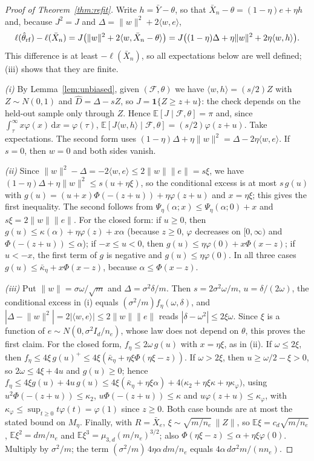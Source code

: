 \documentclass[10pt,a4paper]{article}
\theoremstyle{plain}
\theoremstyle{definition}
\theoremstyle{remark}
\newcommand{\E}{\mathbb{E}}
\newcommand{\Dh}{\widehat{D}}
\newcommand{\Ybar}{\bar{Y}}
\newcommand{\norm}[1]{\lVert #1\rVert}
\newcommand{\ip}[1]{\langle #1\rangle}
\newcommand{\dd}{\mathrm{d}}
\begin{document}
\begin{proof}[Proof of Theorem~\ref{thm:refit}]
Write $h=\Ybar-\theta$, so that $\bar X_n-\theta=(1-\eta)e+\eta h$ and, because $J^2=J$ and $\Delta=\norm w^2+2\ip{w,e}$,
\[
\ell(\hat\theta_{\rm rf})-\ell(\bar X_n)=J\big(\norm w^2+2\ip{w,\bar X_n-\theta}\big)=J\big((1-\eta)\Delta+\eta\norm w^2+2\eta\ip{w,h}\big).
\]
This difference is at least $-\ell(\bar X_n)$, so all expectations below are well defined; (iii) shows that they are finite.

\noindent\textit{(i)} By Lemma~\ref{lem:unbiased}, given $(\mathcal F,\theta)$ we have $\ip{w,h}=(s/2)Z$ with $Z\sim N(0,1)$ and $\Dh=\Delta-sZ$, so $J=\mathbf 1\{Z\ge z+u\}$: the check depends on the held-out sample only through $Z$. Hence $\E[J\mid\mathcal F,\theta]=\pi$ and, since $\int_\tau^\infty x\varphi(x)\,\dd x=\varphi(\tau)$, $\E[J\ip{w,h}\mid\mathcal F,\theta]=(s/2)\varphi(z+u)$. Take expectations. The second form uses $(1-\eta)\Delta+\eta\norm w^2=\Delta-2\eta\ip{w,e}$. If $s=0$, then $w=0$ and both sides vanish.

\noindent\textit{(ii)} Since $\norm w^2-\Delta=-2\ip{w,e}\le2\norm w\norm e=s\xi$, we have $(1-\eta)\Delta+\eta\norm w^2\le s(u+\eta\xi)$, so the conditional excess is at most $s\,g(u)$ with $g(u)=(u+x)\Phi(-(z+u))+\eta\varphi(z+u)$ and $x=\eta\xi$; this gives the first inequality. The second follows from $\Psi_\eta(\alpha;x)\le\Psi_\eta(\alpha;0)+x$ and $s\xi=2\norm w\norm e$. For the closed form: if $u\ge0$, then $g(u)\le\kappa(\alpha)+\eta\varphi(z)+x\alpha$ (because $z\ge0$, $\varphi$ decreases on $[0,\infty)$ and $\Phi(-(z+u))\le\alpha$); if $-x\le u<0$, then $g(u)\le\eta\varphi(0)+x\Phi(x-z)$; if $u<-x$, the first term of $g$ is negative and $g(u)\le\eta\varphi(0)$. In all three cases $g(u)\le\bar\kappa_\eta+x\Phi(x-z)$, because $\alpha\le\Phi(x-z)$.

\noindent\textit{(iii)} Put $\norm w=\sigma\omega/\sqrt m$ and $\Delta=\sigma^2\delta/m$. Then $s=2\sigma^2\omega/m$, $u=\delta/(2\omega)$, the conditional excess in (i) equals $(\sigma^2/m)f_\eta(\omega,\delta)$, and $|\Delta-\norm w^2|=2|\ip{w,e}|\le2\norm w\norm e$ reads $|\delta-\omega^2|\le2\xi\omega$. Since $\xi$ is a function of $e\sim N(0,\sigma^2I_d/n_e)$, whose law does not depend on $\theta$, this proves the first claim. For the closed form, $f_\eta\le2\omega\,g(u)$ with $x=\eta\xi$, as in (ii). If $\omega\le2\xi$, then $f_\eta\le4\xi\,g(u)^+\le4\xi(\bar\kappa_\eta+\eta\xi\Phi(\eta\xi-z))$. If $\omega>2\xi$, then $u\ge\omega/2-\xi>0$, so $2\omega\le4\xi+4u$ and $g(u)\ge0$; hence $f_\eta\le4\xi g(u)+4u\,g(u)\le4\xi(\bar\kappa_\eta+\eta\xi\alpha)+4\big(\kappa_2+\eta\xi\kappa+\eta\kappa_\varphi\big)$, using $u^2\Phi(-(z+u))\le\kappa_2$, $u\Phi(-(z+u))\le\kappa$ and $u\varphi(z+u)\le\kappa_\varphi$, with $\kappa_\varphi\le\sup_{t\ge0}t\varphi(t)=\varphi(1)$ since $z\ge0$. Both case bounds are at most the stated bound on $M_\eta$. Finally, with $R=\bar X_e$, $\xi\sim\sqrt{m/n_e}\,\norm Z$, so $\E\xi=c_d\sqrt{m/n_e}$, $\E\xi^2=dm/n_e$ and $\E\xi^3=\mu_{3,d}(m/n_e)^{3/2}$; also $\Phi(\eta\xi-z)\le\alpha+\eta\xi\varphi(0)$. Multiply by $\sigma^2/m$; the term $(\sigma^2/m)\,4\eta\alpha\,dm/n_e$ equals $4\alpha\,d\sigma^2m/(nn_e)$.


\end{proof}
\end{document}
